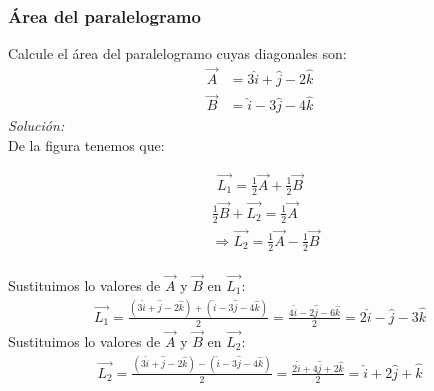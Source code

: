 \documentclass[12pt,openany]{book}
\begin{document}
			\subsubsection{\'Area del paralelogramo}
			 	Calcule el \'area del paralelogramo cuyas diagonales son:
			 	\begin{equation*}
				 	\begin{split}
				 		\vec{A}&=3\hat{i}+\hat{j}-2\hat{k}\\
				 		\vec{B}&=\hat{i}-3\hat{j}-4\hat{k}
				 	\end{split}
				 \end{equation*}
				 \noindent\textsl{Soluci\'on:}\\
				 De la figura tenemos que:
				 \begin{multicols}{2}
					\begin{equation*}
					 	\begin{split}
					 		\vec{L_{1}}=\frac{1}{2}\vec{A}+\frac{1}{2}\vec{B}
					 	\end{split}
					 	\label{L_1}
					 \end{equation*}
				\breakcolumn
					 \begin{equation*}
					 	\begin{split}
					 		&\frac{1}{2}\vec{B}+\vec{L_{2}}=\frac{1}{2}\vec{A}              \\
					 		&\Rightarrow \vec{L_{2}}=\frac{1}{2}\vec{A}-\frac{1}{2}\vec{B}  \\
					 	\end{split}
					 	\label{L_2}
					 \end{equation*}
				 \end{multicols}
				Sustituimos lo valores de $\vec{A}$ y $\vec{B}$ en $\vec{L_{1}}$:
				\begin{equation*}
				 	\begin{split}
				 		\vec{L_{1}}=\frac{(3\hat{i}+\hat{j}-2\hat{k})+(\hat{i}-3\hat{j}-4\hat{k})}{2}  
				 					=\frac{4\hat{i}-2\hat{j}-6\hat{k}}{2}								
				 					=2\hat{i}-\hat{j}-3\hat{k}										    
				 	\end{split}
				 \end{equation*}
				Sustituimos lo valores de $\vec{A}$ y $\vec{B}$ en $\vec{L_{2}}$:
				\begin{equation*}
				 	\begin{split}
				 		\vec{L_{2}}=\frac{(3\hat{i}+\hat{j}-2\hat{k})-(\hat{i}-3\hat{j}-4\hat{k})}{2}  
				 					=\frac{2\hat{i}+4\hat{j}+2\hat{k}}{2} 									
				 					=\hat{i}+2\hat{j}+\hat{k}
				 	\end{split}
				 \end{equation*}
\end{document}
